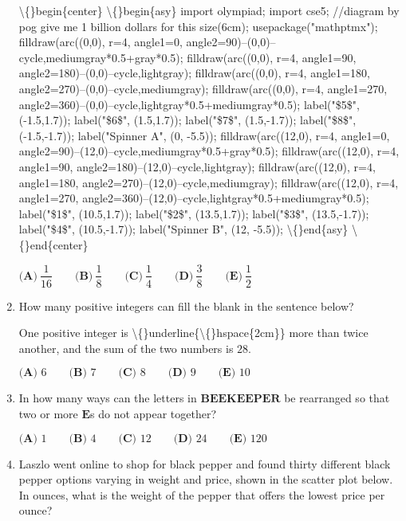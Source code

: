 \documentclass{article}
\begin{document}
\begin{enumerate}[label=\arabic*., itemsep=0.5em]
\textbackslash\{\}begin\{center\}
\textbackslash\{\}begin\{asy\}
import olympiad;
import cse5;
//diagram by pog give me 1 billion dollars for this
size(6cm);
usepackage("mathptmx");
filldraw(arc((0,0), r=4, angle1=0, angle2=90)--(0,0)--cycle,mediumgray*0.5+gray*0.5);
filldraw(arc((0,0), r=4, angle1=90, angle2=180)--(0,0)--cycle,lightgray);
filldraw(arc((0,0), r=4, angle1=180, angle2=270)--(0,0)--cycle,mediumgray);
filldraw(arc((0,0), r=4, angle1=270, angle2=360)--(0,0)--cycle,lightgray*0.5+mediumgray*0.5);
label("\$5\$", (-1.5,1.7));
label("\$6\$", (1.5,1.7));
label("\$7\$", (1.5,-1.7));
label("\$8\$", (-1.5,-1.7));
label("Spinner A", (0, -5.5));
filldraw(arc((12,0), r=4, angle1=0, angle2=90)--(12,0)--cycle,mediumgray*0.5+gray*0.5);
filldraw(arc((12,0), r=4, angle1=90, angle2=180)--(12,0)--cycle,lightgray);
filldraw(arc((12,0), r=4, angle1=180, angle2=270)--(12,0)--cycle,mediumgray);
filldraw(arc((12,0), r=4, angle1=270, angle2=360)--(12,0)--cycle,lightgray*0.5+mediumgray*0.5);
label("\$1\$", (10.5,1.7));
label("\$2\$", (13.5,1.7));
label("\$3\$", (13.5,-1.7));
label("\$4\$", (10.5,-1.7));
label("Spinner B", (12, -5.5));
\textbackslash\{\}end\{asy\}
\textbackslash\{\}end\{center\}

\(\textbf{(A)} ~\dfrac{1}{16}\qquad\textbf{(B)} ~\dfrac{1}{8}\qquad\textbf{(C)} ~\dfrac{1}{4}\qquad\textbf{(D)} ~\dfrac{3}{8}\qquad\textbf{(E)} ~\dfrac{1}{2}\)\par \vspace{0.5em}\item How many positive integers can fill the blank in the sentence below?

One positive integer is \textbackslash\{\}underline\{\textbackslash\{\}hspace\{2cm\}\} more than twice another, and the sum of the two numbers is \(28\).

\(\textbf{(A) } 6 \qquad \textbf{(B) } 7 \qquad \textbf{(C) } 8 \qquad \textbf{(D) } 9 \qquad \textbf{(E) } 10\)\par \vspace{0.5em}\item In how many ways can the letters in \(\textbf{BEEKEEPER}\) be rearranged so that two or more \(\textbf{E}\)s do not appear together?

\(\textbf{(A) } 1 \qquad \textbf{(B) } 4 \qquad \textbf{(C) } 12 \qquad \textbf{(D) } 24 \qquad \textbf{(E) } 120\)\par \vspace{0.5em}\item Laszlo went online to shop for black pepper and found thirty different black pepper options varying in weight and price, shown in the scatter plot below. In ounces, what is the weight of the pepper that offers the lowest price per ounce?



\end{enumerate}
\end{document}
